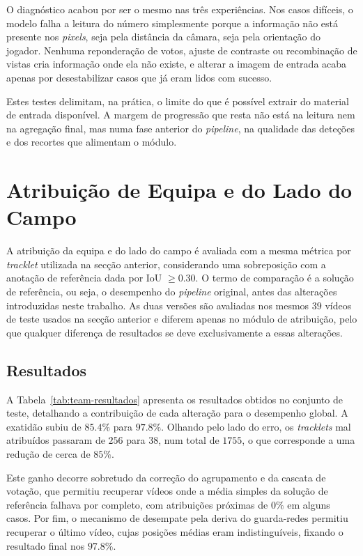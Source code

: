 O diagnóstico acabou por ser o mesmo nas três experiências. Nos casos difíceis, o modelo
falha a leitura do número simplesmente porque a informação não está presente nos
\emph{pixels}, seja pela distância da câmara, seja pela orientação do jogador. Nenhuma
reponderação de votos, ajuste de contraste ou recombinação de vistas cria informação onde
ela não existe, e alterar a imagem de entrada acaba apenas por desestabilizar casos que já
eram lidos com sucesso.

Estes testes delimitam, na prática, o limite do que é possível extrair do material de
entrada disponível. A margem de progressão que resta não está na leitura nem na agregação
final, mas numa fase anterior do \emph{pipeline}, na qualidade das deteções e dos recortes
que alimentam o módulo.


\section{Atribuição de Equipa e do Lado do Campo}
\label{sec:res_equipa}

A atribuição da equipa e do lado do campo é avaliada com a mesma métrica por
\emph{tracklet} utilizada na secção anterior, considerando uma sobreposição com a anotação
de referência dada por IoU $\geq 0.30$. O termo de comparação é a solução de referência, ou
seja, o desempenho do \emph{pipeline} original, antes das alterações introduzidas neste
trabalho. As duas versões são avaliadas nos mesmos $39$ vídeos de teste usados na secção
anterior e diferem apenas no módulo de atribuição, pelo que qualquer diferença de
resultados se deve exclusivamente a essas alterações.

\subsection{Resultados}
\label{sec:res_equipa_resultados}

A Tabela~\ref{tab:team-resultados} apresenta os resultados obtidos no conjunto de teste,
detalhando a contribuição de cada alteração para o desempenho global. A exatidão subiu de
$85.4\%$ para $97.8\%$. Olhando pelo lado do erro, os \emph{tracklets} mal atribuídos
passaram de $256$ para $38$, num total de $1755$, o que corresponde a uma redução de cerca
de $85\%$.

Este ganho decorre sobretudo da correção do agrupamento e da cascata de votação, que
permitiu recuperar vídeos onde a média simples da solução de referência falhava por
completo, com atribuições próximas de $0\%$ em alguns casos. Por fim, o mecanismo de
desempate pela deriva do guarda-redes permitiu recuperar o último vídeo, cujas posições
médias eram indistinguíveis, fixando o resultado final nos $97.8\%$.

